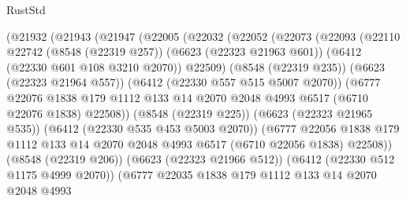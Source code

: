 \begin{lexlean}{RustStd}
\begin{coremodule}
                  (@21932
                    (@21943
                      (@21947
                        (@22005
                          (@22032
                            (@22052
                              (@22073
                                (@22093
                                  (@22110
                                    @22742
                                    (@8548 (@22319 @257))
                                    (@6623 (@22323 @21963 @601))
                                    (@6412 (@22330 @601 @108 @3210 @2070))
                                    @22509)
                                  (@8548 (@22319 @235))
                                  (@6623 (@22323 @21964 @557))
                                  (@6412 (@22330 @557 @515 @5007 @2070))
                                  (@6777
                                    @22076
                                    @1838
                                    @179
                                    @1112
                                    @133
                                    @14
                                    @2070
                                    @2048
                                    @4993
                                    @6517
                                    (@6710 @22076 @1838)
                                    @22508))
                                (@8548 (@22319 @225))
                                (@6623 (@22323 @21965 @535))
                                (@6412 (@22330 @535 @453 @5003 @2070))
                                (@6777
                                  @22056
                                  @1838
                                  @179
                                  @1112
                                  @133
                                  @14
                                  @2070
                                  @2048
                                  @4993
                                  @6517
                                  (@6710 @22056 @1838)
                                  @22508))
                              (@8548 (@22319 @206))
                              (@6623 (@22323 @21966 @512))
                              (@6412 (@22330 @512 @1175 @4999 @2070))
                              (@6777
                                @22035
                                @1838
                                @179
                                @1112
                                @133
                                @14
                                @2070
                                @2048
                                @4993

\end{coremodule}
\end{lexlean}
